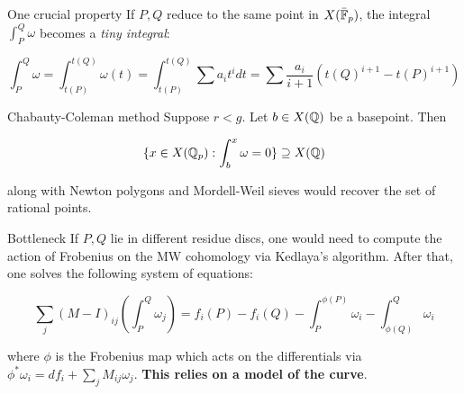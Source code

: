 \begin{frame}{One crucial property}
If $P,Q$ reduce to the same point in $X(\bar{\mathbb{F}}_p)$, the integral $\int_P^Q \omega$ becomes a \textit{tiny integral}:

\[
\int_P^Q \omega = \int_{t(P)}^{t(Q)} \omega(t) = \int_{t(P)}^{t(Q)} \sum a_i t^i dt = \sum \frac{a_i}{i+1} (t(Q)^{i+1} - t(P)^{i+1})
\]
\end{frame}


\begin{frame}{Chabauty-Coleman method}
Suppose $r < g$. Let $b \in X(\mathbb{Q})$ be a basepoint. Then

\[
\{ x \in X(\mathbb{Q}_p): \int_b^x \omega = 0 \} \supseteq X(\mathbb{Q})
\]

along with Newton polygons and Mordell-Weil sieves would recover the set of rational points.

\end{frame}

\begin{frame}{Bottleneck}
If $P,Q$ lie in different residue discs, one would need to compute the action of Frobenius on the MW cohomology via Kedlaya's algorithm. After that, one solves the following system of equations:

\[
\sum_j (M - I)_{ij}(\int_P^Q \omega_j) = f_i(P) - f_i(Q) - \int_P^{\phi(P)} \omega_i - \int_{\phi(Q)}^Q \omega_i
\]

where $\phi$ is the Frobenius map which acts on the differentials via $\phi^* \omega_i = df_i + \sum_j M_{ij}\omega_j$. \textbf{This relies on a model of the curve}.
\end{frame}


